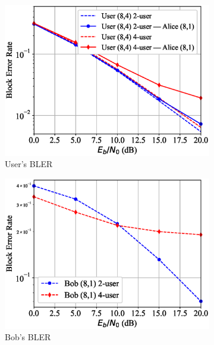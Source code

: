 \begin{figure}[tp!]
	\begin{subfigure}{0.28\textwidth}
		\includegraphics[width=\linewidth]{figs/multi_covert_autoencoder_bler_rayleigh}
		\caption{User's BLER}
		\label{fig:multi_rayleigh_results_ae}
	\end{subfigure}
	\hspace*{\fill}
	\begin{subfigure}{0.28\textwidth}
		\includegraphics[width=\linewidth]{figs/multi_bob_bler_rayleigh}
		\caption{Bob's BLER}
		\label{fig:multi_rayleigh_results_bob}	
	\end{subfigure}
	\hspace*{\fill}
	\begin{subfigure}{0.28\textwidth}

\end{subfigure}
\end{figure}
